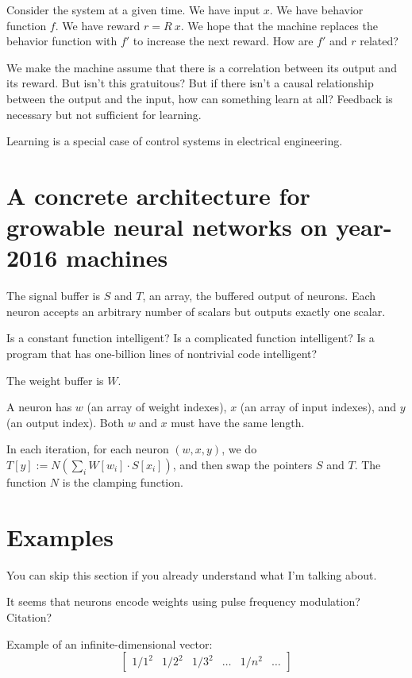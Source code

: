 Consider the system at a given time.
We have input \(x\).
We have behavior function \(f\).
We have reward \(r = R~x\).
We hope that the machine
replaces the behavior function with \(f'\)
to increase the next reward.
How are \(f'\) and \(r\) related?

We make the machine assume that there is a correlation
between its output and its reward.
But isn't this gratuitous?
But if there isn't a causal relationship between the output and the input,
how can something learn at all?
Feedback is necessary but not sufficient for learning.

Learning is a special case of control systems in electrical engineering.

\section{A concrete architecture for growable neural networks on year-2016 machines}

The signal buffer is \(S\) and \(T\), an array, the buffered output of neurons.
Each neuron accepts an arbitrary number of scalars but outputs exactly one scalar.

Is a constant function intelligent? Is a complicated function intelligent?
Is a program that has one-billion lines of nontrivial code intelligent?

The weight buffer is \(W\).

A neuron has \(w\) (an array of weight indexes), \(x\) (an array of input indexes), and \(y\) (an output index).
Both \(w\) and \(x\) must have the same length.

In each iteration, for each neuron \((w,x,y)\),
we do \(T[y] := N \left( \sum_i W[w_i] \cdot S[x_i] \right) \),
and then swap the pointers \(S\) and \(T\).
The function \(N\) is the clamping function.

\section{Examples}

You can skip this section if you already understand what I'm talking about.

It seems that neurons encode weights using pulse frequency modulation? Citation?

Example of an infinite-dimensional vector:
\[
\begin{bmatrix}
1/1^2 & 1/2^2 & 1/3^2 & \ldots & 1/n^2 & \ldots
\end{bmatrix}
\]


